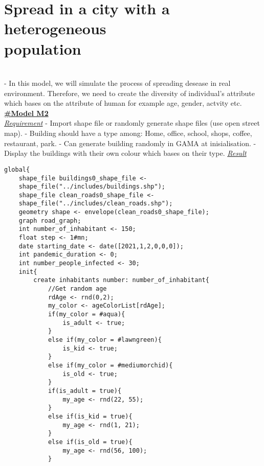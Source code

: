\documentclass{article}
\begin{document}
\section{Spread in a city with a heterogeneous \\population}
\\- In this model, we will simulate the process of spreading desease in real environment. Therefore, we need to create the diversity of individual's attribute which bases on the attribute of human for example age, gender, actvity etc.
\newpage
\underline{\textbf{#Model M2}}
\\
\underline{\emph{Requirement}}
\newline\newline
- Import shape file or randomly generate shape files (use open street map).
- Building should have a type among: Home, office, school, shops, coffee, restaurant, park.
- Can generate building randomly in GAMA at inisialisation.
- Display the buildings with their own colour which bases on their type.
\newline\newline
\underline{\emph{Result}}\\
\newline\newline
\begin{tcolorbox}
\begin{lstlisting}
global{
	shape_file buildings0_shape_file <- 
	shape_file("../includes/buildings.shp");
	shape_file clean_roads0_shape_file <- 
	shape_file("../includes/clean_roads.shp");
	geometry shape <- envelope(clean_roads0_shape_file);
	graph road_graph;
	int number_of_inhabitant <- 150;
	float step <- 1#mn;
	date starting_date <- date([2021,1,2,0,0,0]);
	int pandemic_duration <- 0;
	int number_people_infected <- 30;
	init{
		create inhabitants number: number_of_inhabitant{
			//Get random age
			rdAge <- rnd(0,2);
			my_color <- ageColorList[rdAge];
			if(my_color = #aqua){
				is_adult <- true;
			}
			else if(my_color = #lawngreen){
				is_kid <- true;
			}
			else if(my_color = #mediumorchid){
				is_old <- true;
			}
			if(is_adult = true){
				my_age <- rnd(22, 55);
			}
			else if(is_kid = true){
				my_age <- rnd(1, 21);
			}
			else if(is_old = true){
				my_age <- rnd(56, 100);
			}
\end{lstlisting}
\end{tcolorbox}
\end{document}
